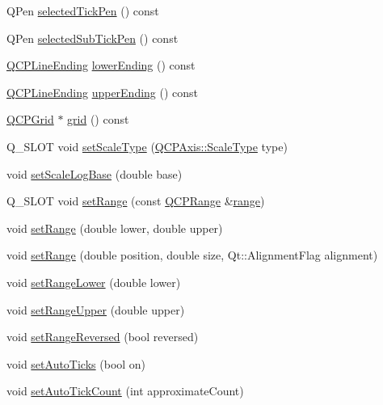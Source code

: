 \begin{DoxyCompactItemize}
\item 
Q\+Pen \hyperlink{class_q_c_p_axis_a9f86ef82e1d1a908ab4c68cfa5fe4175}{selected\+Tick\+Pen} () const 
\item 
Q\+Pen \hyperlink{class_q_c_p_axis_a1b264fdfef48c22aba36e76de7856784}{selected\+Sub\+Tick\+Pen} () const 
\item 
\hyperlink{class_q_c_p_line_ending}{Q\+C\+P\+Line\+Ending} \hyperlink{class_q_c_p_axis_ac85aebbedf67d7bc9e1e5c182151536b}{lower\+Ending} () const 
\item 
\hyperlink{class_q_c_p_line_ending}{Q\+C\+P\+Line\+Ending} \hyperlink{class_q_c_p_axis_aad503ac95ee34e614ffee0bd66473e1a}{upper\+Ending} () const 
\item 
\hyperlink{class_q_c_p_grid}{Q\+C\+P\+Grid} $\ast$ \hyperlink{class_q_c_p_axis_ac4fb913cce3072b5e75a4635e0f6cd04}{grid} () const 
\item 
Q\+\_\+\+S\+L\+O\+T void \hyperlink{class_q_c_p_axis_adef29cae617af4f519f6c40d1a866ca6}{set\+Scale\+Type} (\hyperlink{class_q_c_p_axis_a36d8e8658dbaa179bf2aeb973db2d6f0}{Q\+C\+P\+Axis\+::\+Scale\+Type} type)
\item 
void \hyperlink{class_q_c_p_axis_a726186054be90487885a748aa1b42188}{set\+Scale\+Log\+Base} (double base)
\item 
Q\+\_\+\+S\+L\+O\+T void \hyperlink{class_q_c_p_axis_aebdfea5d44c3a0ad2b4700cd4d25b641}{set\+Range} (const \hyperlink{class_q_c_p_range}{Q\+C\+P\+Range} \&\hyperlink{class_q_c_p_axis_ab1ea79a4f5ea4cf42620f8f51c477ac4}{range})
\item 
void \hyperlink{class_q_c_p_axis_a57d6ee9e9009fe88cb19db476ec70bca}{set\+Range} (double lower, double upper)
\item 
void \hyperlink{class_q_c_p_axis_acf60e5b2d631fbc8c4548c3d579cb6d0}{set\+Range} (double position, double size, Qt\+::\+Alignment\+Flag alignment)
\item 
void \hyperlink{class_q_c_p_axis_afcf51227d337db28d1a9ce9a4d1bc91a}{set\+Range\+Lower} (double lower)
\item 
void \hyperlink{class_q_c_p_axis_acd3ca1247aa867b540cd5ec30ccd3bef}{set\+Range\+Upper} (double upper)
\item 
void \hyperlink{class_q_c_p_axis_a2172fdb196b1a0dc3f40992fcad8e9e1}{set\+Range\+Reversed} (bool reversed)
\item 
void \hyperlink{class_q_c_p_axis_ae867c23d3a6a7bd4d09cc66c5d018f63}{set\+Auto\+Ticks} (bool on)
\item 
void \hyperlink{class_q_c_p_axis_a7c7111cbeac9ec5fcb40f93a1ef51a0b}{set\+Auto\+Tick\+Count} (int approximate\+Count)

\end{DoxyCompactItemize}
